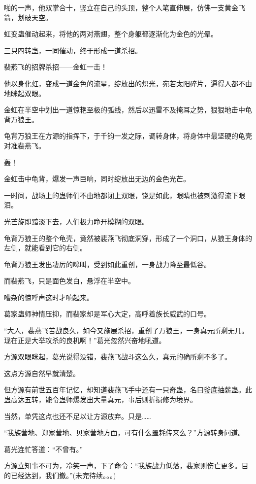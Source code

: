 \begin{this_body}
啪的一声，他双掌合十，竖立在自己的头顶，整个人笔直伸展，仿佛一支黄金飞箭，划破天空。

虹变蛊催动起来，将他的两对燕翅，整个身躯都逐渐化为金色的光晕。

三只四转蛊，一同催动，终于形成一道杀招。

裴燕飞的招牌杀招——金虹一击！

他以身化虹，变成一道金色的流星，绽放出的炽光，宛若太阳碎片，逼得人都不由地眯起双眼。

金虹在半空中划出一道惊艳至极的弧线，然后以迅雷不及掩耳之势，狠狠地击中龟背万狼王。

龟背万狼王在方源的指挥下，于千钧一发之际，调转身体，将身体中最坚硬的龟壳对准裴燕飞。

轰！

金虹击中龟背，爆发一声巨响，同时绽放出无边的金色光芒。

一时间，战场上的蛊师们不由地都闭上双眼，饶是如此，眼睛也被刺激得流下眼泪。

光芒旋即黯淡下去，人们极力睁开模糊的双眼。

龟背万狼王的整个龟壳，竟然被裴燕飞彻底洞穿，形成了一个洞口，从狼王身体的左侧，就能看到它的右侧。

龟背万狼王发出凄厉的嗥叫，受到如此重创，一身战力降至最低谷。

而裴燕飞，只是面色发白，悬浮在半空中。

嘈杂的惊呼声这时才响起来。

葛家蛊师神情压抑，而裴家却是军心大定，高呼着族长威武的口号。

“大人，裴燕飞苦战良久，如今又施展杀招，重创了万狼王，一身真元所剩无几。现在正是大举攻杀的良机啊！”葛光忽然兴奋地吼道。

方源双眼眯起，葛光说得没错，裴燕飞战斗这么久，真元的确所剩不多了。

这点方源自然早就清楚。

但方源有前世五百年记忆，却知道裴燕飞手中还有一只奇蛊，名曰釜底抽薪蛊。此蛊高达五转，能令蛊师爆发出大量真元，事后则折损修为境界。

当然，单凭这点也还不足以让方源放弃。只是……

“我族营地、郑家营地、贝家营地方面，可有什么噩耗传来么？”方源转身问道。

葛光连忙答道：“不曾有。”

方源立知事不可为，冷笑一声，下了命令：“我族战力低落，裴家则伤亡更多。目的已经达到，我们撤。”(未完待续。。。)

\end{this_body}

